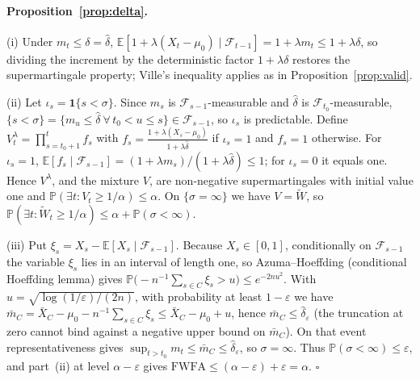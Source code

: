 \documentclass[12pt,a4paper]{article}
\newenvironment{revblock}{}{}
\newenvironment{revblock}{\begingroup\color{revcol}}{\endgroup}
\newcommand{\E}{\mathbb{E}}
\newcommand{\Prob}{\mathbb{P}}
\newcommand{\F}{\mathcal{F}}
\begin{document}
\begin{revblock}
\paragraph{Proposition~\ref{prop:delta}.}
(i) Under $m_t\le\delta=\hat\delta$, $\E[1+\lambda(X_t-\mu_0)\mid\F_{t-1}]=1+\lambda m_t\le1+\lambda\delta$, so dividing the increment by the deterministic factor $1+\lambda\delta$ restores the supermartingale property; Ville's inequality applies as in Proposition~\ref{prop:valid}.

(ii) Let $\iota_s=\mathbf 1\{s<\sigma\}$. Since $m_s$ is $\F_{s-1}$-measurable and $\hat\delta$ is $\F_{t_0}$-measurable, $\{s<\sigma\}=\{m_u\le\hat\delta\ \forall\,t_0<u\le s\}\in\F_{s-1}$, so $\iota_s$ is predictable. Define $V^\lambda_t=\prod_{s=t_0+1}^t f_s$ with $f_s=\frac{1+\lambda(X_s-\mu_0)}{1+\lambda\hat\delta}$ if $\iota_s=1$ and $f_s=1$ otherwise. For $\iota_s=1$, $\E[f_s\mid\F_{s-1}]=(1+\lambda m_s)/(1+\lambda\hat\delta)\le1$; for $\iota_s=0$ it equals one. Hence $V^\lambda$, and the mixture $V$, are non-negative supermartingales with initial value one and $\Prob(\exists t:V_t\ge1/\alpha)\le\alpha$. On $\{\sigma=\infty\}$ we have $V=\widetilde W$, so $\Prob(\exists t:\widetilde W_t\ge1/\alpha)\le\alpha+\Prob(\sigma<\infty)$.

(iii) Put $\xi_s=X_s-\E[X_s\mid\F_{s-1}]$. Because $X_s\in[0,1]$, conditionally on $\F_{s-1}$ the variable $\xi_s$ lies in an interval of length one, so Azuma--Hoeffding (conditional Hoeffding lemma) gives $\Prob\big(-n^{-1}\sum_{s\in C}\xi_s>u\big)\le e^{-2nu^2}$. With $u=\sqrt{\log(1/\varepsilon)/(2n)}$, with probability at least $1-\varepsilon$ we have $\bar m_C=\bar X_C-\mu_0-n^{-1}\sum_{s\in C}\xi_s\le\bar X_C-\mu_0+u$, hence $\bar m_C\le\hat\delta_\varepsilon$ (the truncation at zero cannot bind against a negative upper bound on $\bar m_C$). On that event representativeness gives $\sup_{t>t_0}m_t\le\bar m_C\le\hat\delta_\varepsilon$, so $\sigma=\infty$. Thus $\Prob(\sigma<\infty)\le\varepsilon$, and part~(ii) at level $\alpha-\varepsilon$ gives $\mathrm{FWFA}\le(\alpha-\varepsilon)+\varepsilon=\alpha$. \hfill$\square$


\end{revblock}
\end{document}
